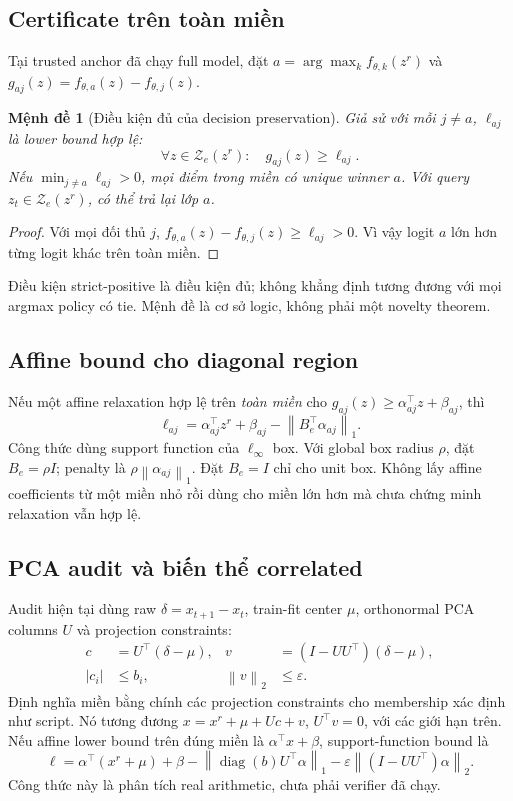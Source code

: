 \documentclass[11pt,a4paper]{article}
\newcommand{\Zset}{\mathcal{Z}}
\newcommand{\norm}[1]{\left\lVert #1\right\rVert}
\newtheorem{proposition}{Mệnh đề}
\begin{document}
\subsection{Certificate trên toàn miền}
Tại trusted anchor đã chạy full model, đặt
\(a=\arg\max_k f_{\theta,k}(z^r)\) và
\(g_{aj}(z)=f_{\theta,a}(z)-f_{\theta,j}(z)\).
\begin{proposition}[Điều kiện đủ của decision preservation]\label{prop}
Giả sử với mỗi \(j\ne a\), \(\ell_{aj}\) là lower bound hợp lệ:
\[
 \forall z\in\Zset_e(z^r):\quad g_{aj}(z)\ge\ell_{aj}.
\]
Nếu \(\min_{j\ne a}\ell_{aj}>0\), mọi điểm trong miền có unique winner \(a\).
Với query \(z_t\in\Zset_e(z^r)\), có thể trả lại lớp \(a\).
\end{proposition}
\begin{proof}
Với mọi đối thủ \(j\), \(f_{\theta,a}(z)-f_{\theta,j}(z)\ge\ell_{aj}>0\).
Vì vậy logit \(a\) lớn hơn từng logit khác trên toàn miền.
\end{proof}
Điều kiện strict-positive là điều kiện đủ; không khẳng định tương đương với
mọi argmax policy có tie. Mệnh đề là cơ sở logic, không phải một novelty theorem.

\subsection{Affine bound cho diagonal region}
Nếu một affine relaxation hợp lệ trên \emph{toàn miền} cho
\(g_{aj}(z)\ge\alpha_{aj}^{\top}z+\beta_{aj}\), thì
\begin{equation}\label{eq:affine}
 \ell_{aj}
 =\alpha_{aj}^{\top}z^r+\beta_{aj}
  -\norm{B_e^\top\alpha_{aj}}_1.
\end{equation}
Công thức dùng support function của \(\ell_\infty\) box.
Với global box radius \(\rho\), đặt \(B_e=\rho I\); penalty là
\(\rho\norm{\alpha_{aj}}_1\). Đặt \(B_e=I\) chỉ cho unit box.
Không lấy affine coefficients từ một miền nhỏ rồi dùng cho miền lớn hơn
mà chưa chứng minh relaxation vẫn hợp lệ.

\subsection{PCA audit và biến thể correlated}
Audit hiện tại dùng raw \(\delta=x_{t+1}-x_t\), train-fit center \(\mu\),
orthonormal PCA columns \(U\) và projection constraints:
\begin{align}
 c&=U^\top(\delta-\mu),&
 v&=(I-UU^\top)(\delta-\mu),\\
 |c_i|&\le b_i,& \norm{v}_2&\le\varepsilon.
\end{align}
Định nghĩa miền bằng chính các projection constraints cho membership xác
định như script. Nó tương đương
\(x=x^r+\mu+Uc+v\), \(U^\top v=0\), với các giới hạn trên.
Nếu affine lower bound trên đúng miền là
\(\alpha^\top x+\beta\), support-function bound là
\begin{equation}
 \ell=\alpha^\top(x^r+\mu)+\beta
 -\norm{\operatorname{diag}(b)U^\top\alpha}_1
 -\varepsilon\norm{(I-UU^\top)\alpha}_2.
\end{equation}
Công thức này là phân tích real arithmetic, chưa phải verifier đã chạy.
\end{document}
